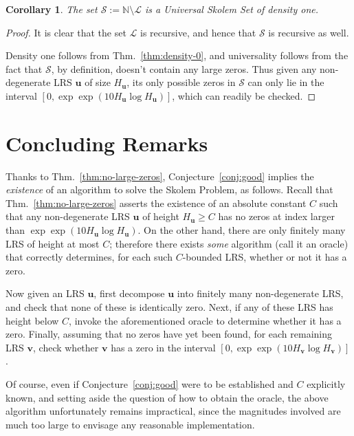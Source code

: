 \documentclass[preprint,12pt]{elsarticle}
\newtheorem{corollary}[theorem]{Corollary}
\begin{document}
\begin{corollary}
The set $\mathcal{S} := \mathbb{N} \setminus \mathcal{L}$ is a Universal Skolem Set of
density one.
\end{corollary}

\begin{proof}
  It is clear that the set $\mathcal{L}$ is recursive, and hence that
  $\mathcal{S}$ is recursive as well.

  Density one follows from Thm.~\ref{thm:density-0}, and universality
  follows from the fact that $\mathcal{S}$, by definition, doesn't
  contain any large zeros. Thus given any non-degenerate LRS
  $\mathbf{u}$ of size $H_{\mathbf{u}}$, its only possible zeros in
  $\mathcal{S}$ can only lie in the interval
  $[0, \exp \exp (10 H_{\mathbf{u}} \log
  H_{\mathbf{u}})]$, which can readily be checked.
\end{proof}

\section{Concluding Remarks}

Thanks to Thm.~\ref{thm:no-large-zeros}, Conjecture~\ref{conj:good}
implies the \emph{existence} of an algorithm to solve the Skolem
Problem, as follows. Recall that Thm.~\ref{thm:no-large-zeros} asserts
the existence of an absolute constant $C$ such that
any non-degenerate LRS $\mathbf{u}$ of height $H_{\mathbf{u}} \geq C$
has no zeros at index larger than $\exp \exp (10 H_{\mathbf{u}} \log
  H_{\mathbf{u}})$. On the other hand, there are only finitely many
  LRS of height at most $C$; therefore there exists \emph{some}
  algorithm (call it an oracle) that correctly determines, for each such $C$-bounded LRS,
  whether or not it has a zero.

  Now given an LRS $\mathbf{u}$, first decompose $\mathbf{u}$ into
  finitely many non-degenerate LRS, and check that none of these is
  identically zero. Next, if any of these LRS has height below $C$,
  invoke the aforementioned oracle to determine whether it has a
  zero. Finally, assuming that no zeros have yet been found, for each
  remaining LRS $\mathbf{v}$, check whether $\mathbf{v}$ has a zero in the
  interval $[0, \exp \exp (10 H_{\mathbf{v}} \log H_{\mathbf{v}})]$.

  Of course, even if Conjecture~\ref{conj:good} were to be established
  and $C$ explicitly known, and setting aside the question of how to
  obtain the oracle, the above algorithm unfortunately remains impractical, since
  the magnitudes involved are much too large to envisage any reasonable implementation.


 

\end{document}
